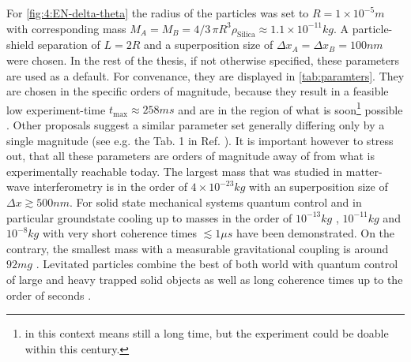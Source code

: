 For \cref{fig:4:EN-delta-theta} the radius of the particles was set to $R=1\times 10^{-5}\si{m}$ with corresponding mass $M_A = M_B = 4/3\, \pi R^3 \rho_\mathrm{Silica} \approx 1.1\times 10^{-11}\si{kg}$.
A particle-shield separation of $L=2R$ and a superposition size of $\Delta x_A = \Delta x_B = 100\si{nm}$ were chosen.
In the rest of the thesis, if not otherwise specified, these parameters are used as a default.
For convenance, they are displayed in \cref{tab:paramters}.
They are chosen in the specific orders of magnitude, because they result in a feasible low experiment-time $t_\mathrm{max}\approx 258\si{ms}$ and are in the region of what is soon\footnote{ in this context means still a long time, but the experiment could be doable within this century.} possible \cite{Aspelmeyer_2024}.
Other proposals suggest a similar parameter set generally differing only by a single magnitude (see e.g. the Tab. 1 in Ref. \cite{Rijavec_2021}).
It is important however to stress out, that all these parameters are orders of magnitude away of from what is experimentally reachable today.
The largest mass that was studied in matter-wave interferometry is in the order of $4\times 10^{-23}\si{kg}$ \cite{Fein_2019} with an superposition size of $\Delta x \gtrsim 500\si{nm}$.
For solid state mechanical systems quantum control and in particular groundstate cooling up to masses in the order of $10^{-13}\si{kg}$ \cite{OConnell_2010}, $10^{-11}\si{kg}$ \cite{Lee_2011} and $10^{-8}\si{kg}$ \cite{Bild_2023} with very short coherence times $\lesssim 1\si{\mu s}$ have been demonstrated.
On the contrary, the smallest mass with a measurable gravitational coupling is around $92 \si{mg}$ \cite{Westphal_2021}.
Levitated particles combine the best of both world with quantum control of large and heavy trapped solid objects as well as long coherence times up to the order of seconds \cite{Aspelmeyer_2024}.

